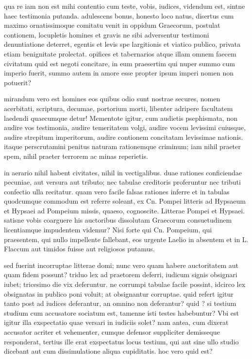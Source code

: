  qua re iam non est mihi contentio cum teste, vobis, iudices, videndum est, sintne haec testimonia putanda. adulescens bonus, honesto loco natus, disertus cum maximo ornatissimoque comitatu venit in oppidum Graecorum, postulat contionem, locupletis homines et gravis ne sibi adversentur testimoni denuntiatione deterret, egentis et levis spe largitionis et viatico publico, privata etiam benignitate prolectat. opifices et tabernarios atque illam omnem faecem civitatum quid est negoti concitare, in eum praesertim qui nuper summo cum imperio fuerit, summo autem in amore esse propter ipsum imperi nomen non potuerit?

 mirandum vero est homines eos quibus odio sunt nostrae secures, nomen acerbitati, scriptura, decumae, portorium morti, libenter adripere facultatem laedendi quaecumque detur! Mementote igitur, cum audietis psephismata, non audire vos testimonia, audire temeritatem volgi, audire vocem levissimi cuiusque, audire strepitum imperitorum, audire contionem concitatam levissimae nationis. itaque perscrutamini penitus naturam rationemque criminum; iam nihil praeter spem, nihil praeter terrorem ac minas reperietis.

 in aerario nihil habent civitates, nihil in vectigalibus. duae rationes conficiendae pecuniae, aut versura aut tributo; nec tabulae creditoris proferuntur nec tributi confectio ulla recitatur. quam vero facile falsas rationes inferre et in tabulas quodcumque commodum est referre soleant, ex Cn. Pompei litteris ad Hypsaeum et Hypsaei ad Pompeium missis, quaeso, cognoscite. Litterae Pompei et Hypsaei. satisne vobis coarguere his auctoribus dissolutam Graecorum consuetudinem licentiamque impudentem videmur? Nisi forte qui Cn. Pompeium, qui praesentem, qui nullo impellente fallebant, eos urgente Laelio in absentem et in L. Flaccum aut timidos fuisse aut religiosos putamus.

 sed fuerint incorruptae litterae domi; nunc vero quam habere auctoritatem aut quam fidem possunt? triduo lex ad praetorem deferri, iudicum signis obsignari iubet; tricesimo die vix deferuntur. ne corrumpi tabulae facile possint, idcirco lex obsignatas in publico poni voluit; at obsignantur corruptae. quid refert igitur tanto post ad iudices deferantur, an omnino non deferantur? quid ? si testium studium cum accusatore sociatum est, tamenne isti testes habebuntur? Vbi est igitur illa exspectatio quae versari in iudiciis solet? nam antea, cum dixerat accusator acriter et vehementer, cumque defensor suppliciter demisseque responderat, tertius ille erat exspectatus locus testium, qui aut sine ullo studio dicebant aut cum dissimulatione aliqua cupiditatis. hoc vero quid est?

